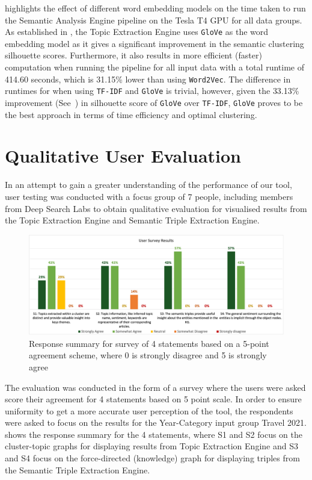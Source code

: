 \vspace{-3ex}
 highlights the effect of different word embedding models on the time taken to run the Semantic Analysis Engine pipeline on the Tesla T4 GPU for all data groups. As established in , the Topic Extraction Engine uses \texttt{GloVe} as the word embedding model as it gives a significant improvement in the semantic clustering silhouette scores. Furthermore, it also results in more efficient (faster) computation when running the pipeline for all input data with a total runtime of 414.60 seconds, which is 31.15\% lower than using \texttt{Word2Vec}. The difference in runtimes for when using \texttt{TF-IDF} and \texttt{GloVe} is trivial, however, given the 33.13\% improvement (See~) in silhouette score of \texttt{GloVe} over \texttt{TF-IDF}, \texttt{GloVe} proves to be the best approach in terms of time efficiency and optimal clustering. 

\section{Qualitative User Evaluation} \label{s:user_eval}
In an attempt to gain a greater understanding of the performance of our tool, user testing was conducted with a focus group of 7 people, including members from Deep Search Labs to obtain qualitative evaluation for visualised results from the Topic Extraction Engine and Semantic Triple Extraction Engine.

\begin{figure}[H]
\centering     %
\includegraphics[width=0.95\linewidth]{images/eval/user_eval.png}
\caption{Response summary for survey of 4 statements based on a 5-point agreement scheme, where 0 is strongly disagree and 5 is strongly agree}
\label{user_eval}
\end{figure}

The evaluation was conducted in the form of a survey where the users were asked score their agreement for 4 statements based on 5 point scale. In order to ensure uniformity to get a more accurate user perception of the tool, the respondents were asked to focus on the results for the Year-Category input group Travel 2021.  shows the response summary for the 4 statements, where S1 and S2 focus on the cluster-topic graphs for displaying results from Topic Extraction Engine and S3 and S4 focus on the force-directed (knowledge) graph for displaying triples from the Semantic Triple Extraction Engine. 

